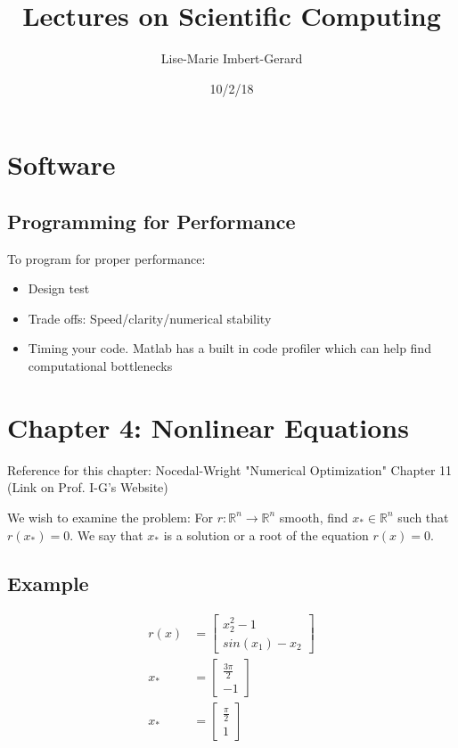 \documentclass{article}
\title{Lectures on Scientific Computing}
\date{10/2/18}
\author{Lise-Marie Imbert-Gerard}
\newcommand{\n}{\newline}
\begin{document}
	\maketitle
	\section{Software}
	\subsection{Programming for Performance}
	To program for proper performance:
	\begin{itemize}
		\item Design test 
		\item Trade offs: Speed/clarity/numerical stability
		\item Timing your code.  Matlab has a built in code profiler which can help find computational bottlenecks 
	\end{itemize}
	\section{Chapter 4: Nonlinear Equations}
	Reference for this chapter: Nocedal-Wright "Numerical Optimization" Chapter 11 (Link on Prof. I-G's Website)\n
	
	We wish to examine the problem: For $r:\mathbb{R}^{n}\rightarrow\mathbb{R}^{n}$ smooth, find $x_{*}\in\mathbb{R}^{n}$ such that $r(x_{*})=0$.  We say that $x_{*}$ is a solution or a root of the equation $r(x)=0$.\n
	
	\subsection{Example}
	
	\begin{align*}
		r(x)&=\begin{bmatrix}
		x_{2}^{2}-1\\
		sin(x_{1})-x_{2}
		\end{bmatrix}\\
		x_{*}&=\begin{bmatrix}
		\frac{3\pi}{2}\\
		-1
		\end{bmatrix}\\
		x_{*}&=\begin{bmatrix}
		\frac{\pi}{2}\\
		1
		\end{bmatrix}
	\end{align*}
	
\end{document}

